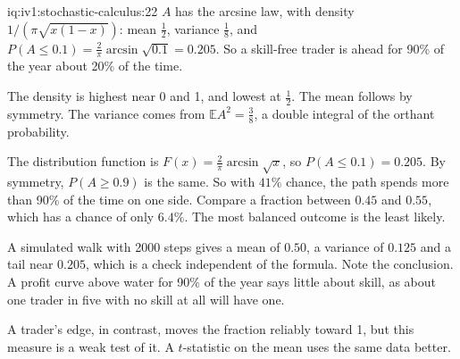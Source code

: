 \begin{solution}{iq:iv1:stochastic-calculus:22}
$A$ has the arcsine law, with density $1/(\pi\sqrt{x(1 - x)})$: mean $\frac12$, variance $\frac18$, and $P(A \le 0.1) = \frac{2}{\pi}\arcsin\sqrt{0.1} = 0.205$. So a skill-free trader is ahead for 90\% of the year about 20\% of the time.

The density is highest near 0 and 1, and lowest at $\frac12$. The mean follows by symmetry. The variance comes from $\mathbb{E}A^2 = \frac38$, a double integral of the orthant probability.

The distribution function is $F(x) = \frac{2}{\pi}\arcsin\sqrt{x}$, so $P(A \le 0.1) = 0.205$. By symmetry, $P(A \ge 0.9)$ is the same. So with $41\%$ chance, the path spends more than 90\% of the time on one side. Compare a fraction between $0.45$ and $0.55$, which has a chance of only $6.4\%$. The most balanced outcome is the least likely.

A simulated walk with 2000 steps gives a mean of $0.50$, a variance of $0.125$ and a tail near $0.205$, which is a check independent of the formula. Note the conclusion. A profit curve above water for 90\% of the year says little about skill, as about one trader in five with no skill at all will have one.

A trader's edge, in contrast, moves the fraction reliably toward 1, but this measure is a weak test of it. A $t$-statistic on the mean uses the same data better.



\end{solution}

